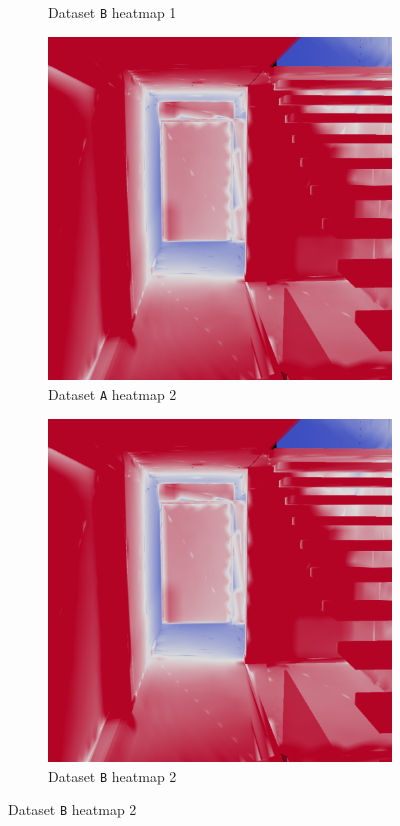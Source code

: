 \begin{figure}
\begin{subfigure}[t]{0.49\linewidth}
		\caption{Dataset \texttt{B} heatmap 1}
	\end{subfigure}
	\begin{subfigure}[t]{0.49\linewidth}
		\includegraphics[width=\textwidth]{chapters/chapter_results/correct2heatmap2}
		\caption{Dataset \texttt{A} heatmap 2}
	\end{subfigure}
	\begin{subfigure}[t]{0.49\linewidth}
		\includegraphics[width=\textwidth]{chapters/chapter_results/wrong2heatmap2}
		\caption{Dataset \texttt{B} heatmap 2}
	\end{subfigure}


\end{figure}
